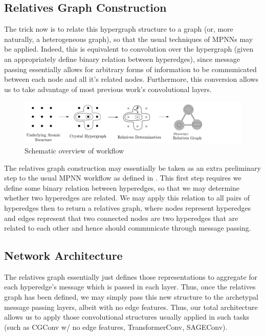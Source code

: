 \documentclass{article}
\begin{document}
\subsection{Relatives Graph Construction}
The trick now is to relate this hypergraph structure to a graph (or, more naturally, a heterogeneous graph), so that the usual techniques of MPNNs may be applied. Indeed, this is equivalent to convolution over the hypergraph (given an appropriately define binary relation between hyperedges), since message passing essentially allows for arbitrary forms of information to be communicated between each node and all it's related nodes. Furthermore, this conversion allows us to take advantage of most previous work's convolutional layers.


\begin{figure}[htbp]
  \centering
  \includegraphics[scale=.48]{relgraph_workflow_horiz.pdf}
  \caption{Schematic overview of workflow}
\end{figure}

The relatives graph construction may essentially be taken as an extra preliminary step to the usual MPNN workflow as defined in%
. This first step requires we define some binary relation between hyperedges, so that we may determine whether two hyperedges are related. We may apply this relation to all pairs of hyperedges then to return a relatives graph, where nodes represent hyperedges and edges represent that two connected nodes are two hyperedges that are related to each other and hence should communicate through message passing.

\subsection{Network Architecture}

The relatives graph essentially just defines those representations to aggregate for each hyperedge's message which is passed in each layer.
Thus, once the relatives graph has been defined, we may simply pass this new structure to the archetypal message passing layers, albeit with no edge features. 
Thus, our total architecture allows us to apply those convolutional structures usually applied in such tasks (such as CGConv w/ no edge features, TransformerConv, SAGEConv).
\end{document}
